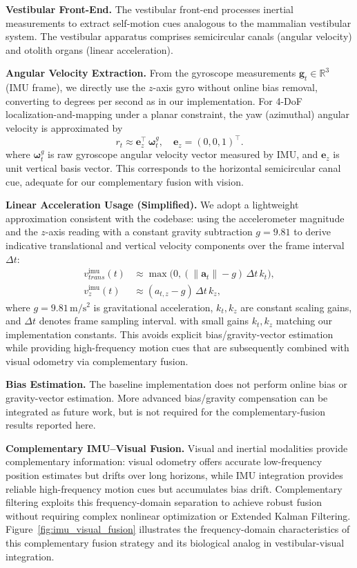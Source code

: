 \textbf{Ves\-tib\-u\-lar Front-End.} The ves\-tib\-u\-lar front-end processes inertial measurements to extract self-motion cues analogous to the mammalian ves\-tib\-u\-lar system. The ves\-tib\-u\-lar apparatus comprises semicircular canals (angular velocity) and otolith organs (linear acceleration).

\textbf{Angular Velocity Extraction.} From the gyroscope measurements $\mathbf{g}_t\in\mathbb{R}^3$ (IMU frame), we directly use the $z$-axis gyro without online bias removal, converting to degrees per second as in our implementation. For 4-DoF lo\-cal\-i\-za\-tion-and-map\-ping under a planar constraint, the yaw (azimuthal) angular velocity is approximated by
\begin{equation}
    r_t \approx \mathbf{e}_z^\top\,\boldsymbol{\omega}_t^g,\quad \mathbf{e}_z=(0,0,1)^\top.
\end{equation}
where $\boldsymbol{\omega}_t^g$ is raw gyroscope angular velocity vector measured by IMU, and $\mathbf{e}_z$ is unit vertical basis vector.
This corresponds to the horizontal semicircular canal cue, adequate for our complementary fusion with vision.

\textbf{Linear Acceleration Usage (Simplified).} We adopt a lightweight approximation consistent with the codebase: using the accelerometer magnitude and the $z$-axis reading with a constant gravity subtraction $g\!=\!9.81$ to derive indicative translational and vertical velocity components over the frame interval $\Delta t$:
\begin{align}
    v^\mathrm{imu}_{trans}(t) & \approx \max\big(0, (\lVert\mathbf{a}_t\rVert - g)\,\Delta t\,k_t\big), \\
    v^\mathrm{imu}_{z}(t)     & \approx (a_{t,z} - g)\,\Delta t\,k_z,
\end{align}
where $g=9.81\,\mathrm{m/s^2}$ is gravitational acceleration, $k_t, k_z$ are constant scaling gains, and $\Delta t$ denotes frame sampling interval.
with small gains $k_t, k_z$ matching our implementation constants. This avoids explicit bias/gravity-vector estimation while providing high-frequency motion cues that are subsequently combined with visual odometry via complementary fusion.

\textbf{Bias Estimation.} The baseline implementation does not perform online bias or gravity-vector estimation. More advanced bias/gravity compensation can be integrated as future work, but is not required for the complementary-fusion results reported here.

\textbf{Com\-ple\-men\-tary IMU--Visual Fusion.} Visual and inertial modalities provide complementary information: visual odometry offers accurate low-frequency position estimates but drifts over long horizons, while IMU integration provides reliable high-frequency motion cues but accumulates bias drift. Com\-ple\-men\-tary filtering exploits this frequency-domain separation to achieve robust fusion without requiring complex nonlinear optimization or Extended Kalman Filtering. Figure~\ref{fig:imu_visual_fusion} illustrates the frequency-domain characteristics of this complementary fusion strategy and its biological analog in ves\-tib\-u\-lar-visual integration.

